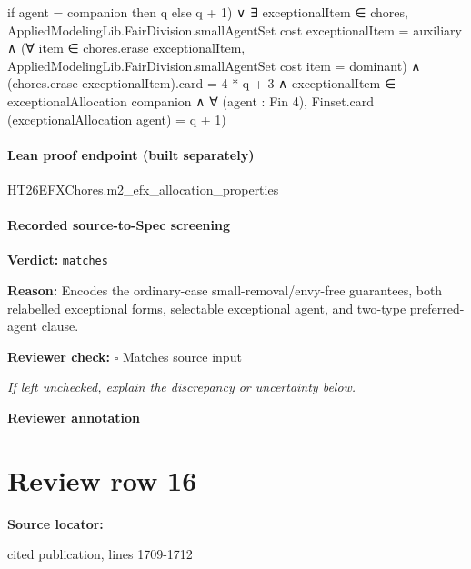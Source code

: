 \documentclass[10pt]{article}
\newcommand{\reviewerbox}{%
  \par\noindent\fbox{\parbox{0.96\linewidth}{\rule{0pt}{0.38in}}}\par
}
\newcommand{\reviewmatch}[1]{%
  \par\noindent\textbf{Reviewer check:} $\square$\; #1\par
  \noindent\emph{If left unchecked, explain the discrepancy or uncertainty below.}\par
}
\begin{document}
\begin{ReviewVerbatim}
                                                          if agent = companion then q else q + 1) ∨
                                                  ∃ exceptionalItem ∈ chores,
                                                    AppliedModelingLib.FairDivision.smallAgentSet cost exceptionalItem =
                                                        auxiliary ∧
                                                      (∀ item ∈ chores.erase exceptionalItem,
                                                          AppliedModelingLib.FairDivision.smallAgentSet cost item =
                                                            dominant) ∧
                                                        (chores.erase exceptionalItem).card = 4 * q + 3 ∧
                                                          exceptionalItem ∈ exceptionalAllocation companion ∧
                                                            ∀ (agent : Fin 4),
                                                              Finset.card (exceptionalAllocation agent) = q + 1)
\end{ReviewVerbatim}



\paragraph{Lean proof endpoint (built separately)}\begin{ReviewVerbatim}
HT26EFXChores.m2_efx_allocation_properties
\end{ReviewVerbatim}

\paragraph{Recorded source-to-Spec screening}
\textbf{Verdict:} \texttt{matches}
\\
{\raggedright
\textbf{Reason:} Encodes the ordinary-\allowbreak{}case small-\allowbreak{}removal/\allowbreak{}envy-\allowbreak{}free guarantees, both relabelled exceptional forms, selectable exceptional agent, and two-\allowbreak{}type preferred-\allowbreak{}agent clause.\allowbreak{}
\par}
\reviewmatch{Matches source input}
\noindent\textbf{Reviewer annotation}\par
\reviewerbox
\clearpage
\hypertarget{source-claim-c475426ec81f3892}{}
\section*{Review row 16}
\textbf{Source locator:} {\footnotesize\raggedright cited publication, lines 1709-\allowbreak{}1712\par}
\end{document}

